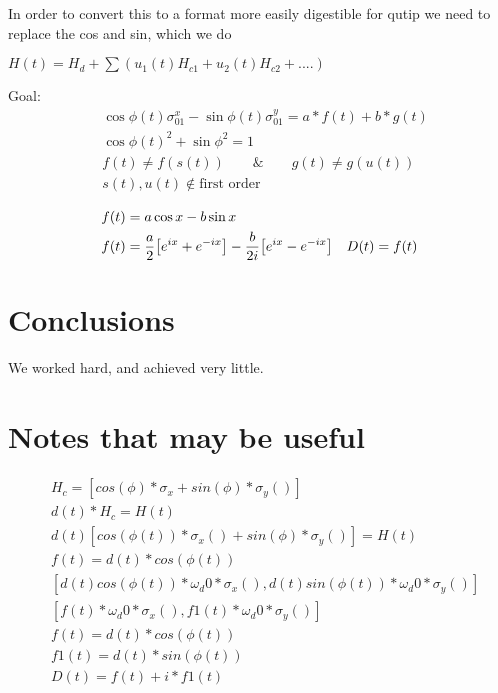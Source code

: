 \documentclass[12pt]{article}
\begin{document}
In order to convert this to a format more easily digestible for qutip we need to replace the cos and sin, which we do

$H(t) = H_d + \sum(u_1(t)H_{c1} + u_2(t)H_{c2} + ....)$

Goal:
\begin{align}
        & \cos{\phi(t)} \sigma^x_{01} - \sin{\phi(t)} \sigma^y_{01} = a*f(t) +b*g(t)\\
        & \cos{\phi(t)}^2 + \sin{\phi}^2 = 1\\
        &  f(t) \neq f(s(t)) \qquad \& \qquad g(t) \neq g(u(t))\\
        & s(t), u(t) \notin \text{first order}
\end{align}

\begin{align}
        & f(t) = a \cos{x} - b \sin{x} \\
        & f(t) = \frac{a}{2} \qty[ e^{ix} + e^{-ix}] - \frac{b}{2i} \qty[e^{ix} - e^{-ix}]
        & D(t) = f(t)
\end{align}

\section{Conclusions}\label{conclusions} We worked
hard, and achieved very little.

\section{Notes that may be useful}
\begin{align}
        & H_c = [cos(\phi) * \sigma_x + sin(\phi) * \sigma_y()] \\
        & d(t)*H_c = H(t) \\
        & d(t) [cos(\phi(t)) * \sigma_x() + sin(\phi) * \sigma_y()] = H(t) \\
        & f(t) = d(t) * cos(\phi(t)) \\
        & [d(t) cos(\phi(t)) * \omega_d0 * \sigma_x(), d(t) sin(\phi(t)) * \omega_d0 * \sigma_y()] \\
        & [f(t) * \omega_d0 * \sigma_x(), f1(t) * \omega_d0 * \sigma_y()] \\
        & f(t) = d(t) * cos(\phi(t)) \\
        & f1(t) = d(t) * sin(\phi(t)) \\
        &  D(t) = f(t) + i * f1(t)
\end{align}


\end{document}
